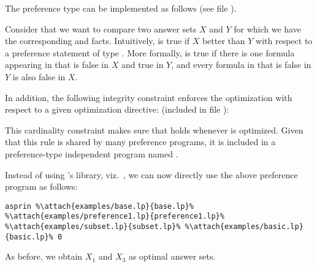 \begin{example}
The preference type  can be implemented as follows
(see file ).
%

%
Consider that we want to compare two answer sets $X$ and $Y$
for which we have the corresponding  and  facts. 
Intuitively,  is true if $X$ better than $Y$ with respect to a preference statement  
of type . 
More formally, 
 is true if there is one formula  appearing in  that is false in $X$ and true in $Y$, 
and every formula  in  that is false in $Y$ is also false in $X$.  

In addition, 
the following integrity constraint enforces the optimization with respect to a given optimization directive:
(included in file ):
%

%
This cardinality constraint makes sure that  holds whenever  is optimized. 
Given that this rule is shared by many preference programs, 
it is included in a preference-type independent program named .

Instead of using \asprin's library, viz.~, 
we can now directly use the above preference program as follows:
\begin{lstlisting}[numbers=none,escapechar=\%]
asprin %\attach{examples/base.lp}{base.lp}% %\attach{examples/preference1.lp}{preference1.lp}% %\attach{examples/subset.lp}{subset.lp}% %\attach{examples/basic.lp}{basic.lp}% 0
\end{lstlisting}
As before, we obtain $X_1$ and $X_3$ as optimal answer sets.
\end{example}

